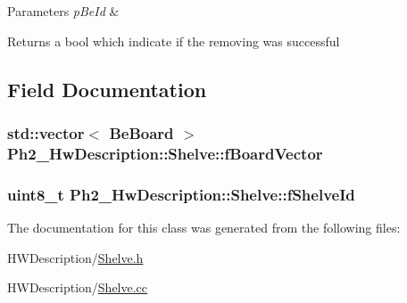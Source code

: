 \begin{DoxyParams}{Parameters}
{\em p\-Be\-Id} & \\
\hline
\end{DoxyParams}
\begin{DoxyReturn}{Returns}
a bool which indicate if the removing was successful 
\end{DoxyReturn}


\subsection{Field Documentation}
\hypertarget{class_ph2___hw_description_1_1_shelve_a5b87ee50bb6046acadaeb8226395da52}{
\subsubsection[{f\-Board\-Vector}]{\setlength{\rightskip}{0pt plus 5cm}std\-::vector$<$ {\bf Be\-Board} $>$ Ph2\-\_\-\-Hw\-Description\-::\-Shelve\-::f\-Board\-Vector\hspace{0.3cm}{\ttfamily [private]}}}\label{class_ph2___hw_description_1_1_shelve_a5b87ee50bb6046acadaeb8226395da52}
\hypertarget{class_ph2___hw_description_1_1_shelve_ad6a771be1946db28ff6418ac419ef543}{
\subsubsection[{f\-Shelve\-Id}]{\setlength{\rightskip}{0pt plus 5cm}uint8\-\_\-t Ph2\-\_\-\-Hw\-Description\-::\-Shelve\-::f\-Shelve\-Id}}\label{class_ph2___hw_description_1_1_shelve_ad6a771be1946db28ff6418ac419ef543}


The documentation for this class was generated from the following files\-:\begin{DoxyCompactItemize}
\item 
H\-W\-Description/\hyperlink{_shelve_8h}{Shelve.\-h}\item 
H\-W\-Description/\hyperlink{_shelve_8cc}{Shelve.\-cc}\end{DoxyCompactItemize}
